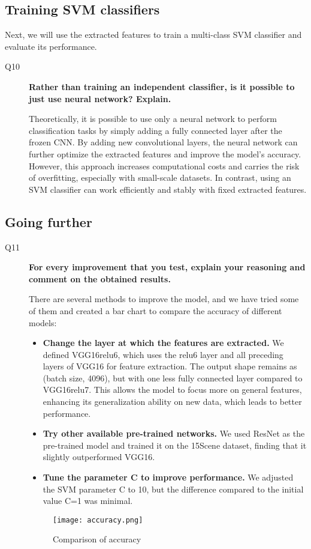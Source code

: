 \documentclass{rapportECL}
\begin{document}
\subsection{Training SVM classifiers}
Next, we will use the extracted features to train a multi-class SVM classifier and evaluate its performance.

\begin{description}
    \item[Q10] \textbf{Rather than training an independent classifier, is it possible to just use neural network? Explain.}

    Theoretically, it is possible to use only a neural network to perform classification tasks by simply adding a fully connected layer after the frozen CNN. By adding new convolutional layers, the neural network can further optimize the extracted features and improve the model's accuracy. However, this approach increases computational costs and carries the risk of overfitting, especially with small-scale datasets. In contrast, using an SVM classifier can work efficiently and stably with fixed extracted features.

\end{description}

\subsection{Going further}

\begin{description}
    \item[Q11] \textbf{For every improvement that you test, explain your reasoning and comment on the obtained results.}
    
    There are several methods to improve the model, and we have tried some of them and created a bar chart to compare the accuracy of different models:
    \begin{itemize}
        \item \textbf{Change the layer at which the features are extracted.} We defined VGG16relu6, which uses the relu6 layer and all preceding layers of VGG16 for feature extraction. The output shape remains as (batch size, 4096), but with one less fully connected layer compared to VGG16relu7. This allows the model to focus more on general features, enhancing its generalization ability on new data, which leads to better performance.
        \item \textbf{Try other available pre-trained networks.} We used ResNet as the pre-trained model and trained it on the 15Scene dataset, finding that it slightly outperformed VGG16.
        \item \textbf{Tune the parameter C to improve performance.} We adjusted the SVM parameter C to 10, but the difference compared to the initial value C=1 was minimal.
    \end{itemize}
    \begin{figure}[H]
        \centering
        \texttt{[image: accuracy.png]}
        \caption{Comparison of accuracy}
        \label{fig:enter-label}
    \end{figure}
\end{description}
\end{document}
